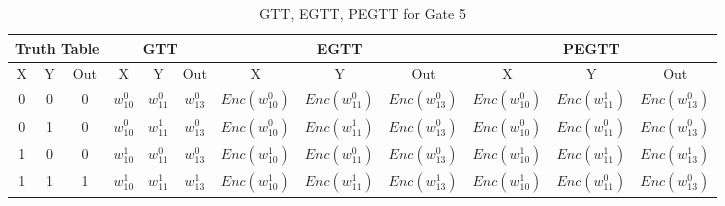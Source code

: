 \documentclass[times]{article}
\begin{document}
	\begin{table}
		\centering
		\caption{GTT, EGTT, PEGTT for Gate 5}
		\label{tab:gtt5}
		\begin{adjustbox}{width=1\textwidth}
		\begin{tabular}{|c|c|c||c|c|c||c|c|c||c|c|c|}
			\hline
			\multicolumn{3}{|c||}{Truth Table} 		& 
				\multicolumn{3}{|c||}{GTT}			& 
					\multicolumn{3}{|c||}{EGTT} 		& 
						\multicolumn{3}{|c|}{PEGTT} \\
			\hline
			\hline
			X & Y & Out	& 
				X & Y & Out	& 
					X & Y & Out	& 
						X & Y & Out	\\
			\hline
			0 & 0 & 0 	&
				$w_{10}^0$	& $w_{11}^0$	& $w_{13}^0$	& 
					$Enc(w_{10}^0)$	& $Enc(w_{11}^0)$	& $Enc(w_{13}^0)$ &
						$Enc(w_{10}^0)$	& $Enc(w_{11}^1)$	& $Enc(w_{13}^0)$ \\
			\hline
			0 & 1 & 0 	&
				$w_{10}^0$	& $w_{11}^1$	& $w_{13}^0$	& 
					$Enc(w_{10}^0)$	& $Enc(w_{11}^1)$	& $Enc(w_{13}^0)$ &
						$Enc(w_{10}^0)$	& $Enc(w_{11}^0)$	& $Enc(w_{13}^0)$ \\
			\hline
			1 & 0 & 0 	&
				$w_{10}^1$	& $w_{11}^0$	& $w_{13}^0$	& 
					$Enc(w_{10}^1)$	& $Enc(w_{11}^0)$	& $Enc(w_{13}^0)$ &
						$Enc(w_{10}^1)$	& $Enc(w_{11}^1)$	& $Enc(w_{13}^1)$ \\
			\hline
			1 & 1 & 1 	&
				$w_{10}^1$	& $w_{11}^1$	& $w_{13}^1$	& 
					$Enc(w_{10}^1)$	& $Enc(w_{11}^1)$	& $Enc(w_{13}^1)$ &
						$Enc(w_{10}^1)$	& $Enc(w_{11}^0)$	& $Enc(w_{13}^0)$ \\
			\hline
		\end{tabular}
		\end{adjustbox}
	\end{table}
\end{document}
